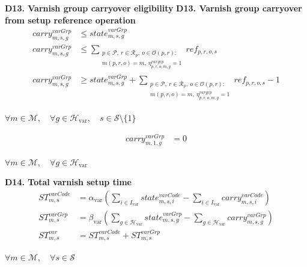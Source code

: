 \documentclass{article}
\begin{document}
\noindent\textbf{D13. Varnish group carryover eligibility}
\noindent\textbf{D13. Varnish group carryover from setup reference operation}
\begin{align}
carry^{varGrp}_{m,s,g}
&\le
state^{varGrp}_{m,s,g}
\label{eq:D13_var_group_carry_current_state}
\\
carry^{varGrp}_{m,s,g}
&\le
\sum_{\substack{
p \in \mathcal{P},\ r \in \mathcal{R}_p,\ o \in \mathcal{O}(p,r):\\
m(p,r,o)=m,\ \eta^{vargrp}_{p,r,o,m,g}=1
}}
ref_{p,r,o,s}
\label{eq:D13_var_group_carry_reference_ub}
\\
carry^{varGrp}_{m,s,g}
&\ge
state^{varGrp}_{m,s,g}
+
\sum_{\substack{
p \in \mathcal{P},\ r \in \mathcal{R}_p,\ o \in \mathcal{O}(p,r):\\
m(p,r,o)=m,\ \eta^{vargrp}_{p,r,o,m,g}=1
}}
ref_{p,r,o,s}
- 1
\label{eq:D13_var_group_carry_reference_lb}
\end{align}
\begin{center}
$\forall m \in \mathcal{M}, \quad
\forall g \in \mathcal{H}_{\text{var}}, \quad
s \in \mathcal{S}\setminus\{1\}$
\end{center}

\begin{align}
carry^{varGrp}_{m,1,g}
&=
0
\label{eq:D13_var_group_carry_initial}
\end{align}
\begin{center}
$\forall m \in \mathcal{M}, \quad
\forall g \in \mathcal{H}_{\text{var}}$
\end{center}

\noindent\textbf{D14. Total varnish setup time}
\begin{align}
ST^{varCode}_{m,s}
&=
\alpha_{\text{var}}
\left(
\sum_{i \in I_{\text{var}}}
state^{varCode}_{m,s,i}
-
\sum_{i \in I_{\text{var}}}
carry^{varCode}_{m,s,i}
\right)
\label{eq:D14_var_code_time}
\\
ST^{varGrp}_{m,s}
&=
\beta_{\text{var}}
\left(
\sum_{g \in \mathcal{H}_{\text{var}}}
state^{varGrp}_{m,s,g}
-
\sum_{g \in \mathcal{H}_{\text{var}}}
carry^{varGrp}_{m,s,g}
\right)
\label{eq:D14_var_group_time}
\\
ST^{var}_{m,s}
&=
ST^{varCode}_{m,s}
+
ST^{varGrp}_{m,s}
\label{eq:D14_var_time}
\end{align}
\begin{center}
$\forall m \in \mathcal{M}, \quad \forall s \in \mathcal{S}$
\end{center}


\pagebreak
\noindent\text{---------------------------------------------------------------------------------------------------------}
\end{document}
